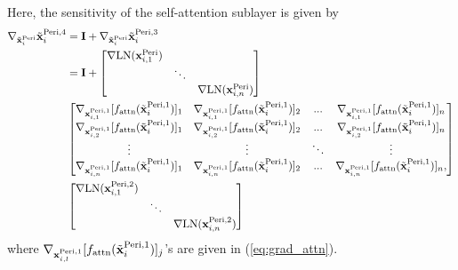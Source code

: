 \documentclass[journal]{IEEEtran}
\newcommand{\bfI}{{\bf I}}
\newcommand{\bfx}{{\bf x}}
\theoremstyle{plain}
\theoremstyle{definition}
\theoremstyle{remark}
\begin{document}
Here, the sensitivity of the self-attention sublayer is given by
\begin{align}
    \nabla_{\tilde{\bfx}_i^{{\rm Peri}}} \tilde{\bfx}_i^{{\rm Peri}, 4} &= \bfI +  \nabla_{\tilde{\bfx}_i^{{\rm Peri}}} \tilde{\bfx}_i^{{\rm Peri}, 3} \\
    &= \bfI + \begin{bmatrix}
\nabla {\rm LN}(\bfx^{{\rm Peri}}_{i, 1}) &        &        \\
                 & \ddots &        \\
                 &        & \nabla {\rm LN}(\bfx^{{\rm Peri}}_{i, n})
\end{bmatrix} \\ &
\begin{bmatrix}
\nabla_{\bfx^{{\rm Peri},1}_{i, 1}} [f_{\rm attn}(\tilde{\bfx}^{{\rm Peri},1}_{i})]_1 &  \nabla_{\bfx^{{\rm Peri},1}_{i, 1}} [f_{\rm attn}(\tilde{\bfx}^{{\rm Peri},1}_{i})]_2  & ...    &    \nabla_{\bfx^{{\rm Peri},1}_{i, 1}} [f_{\rm attn}(\tilde{\bfx}^{{\rm Peri},1}_{i})]_n    \\
\nabla_{\bfx^{{\rm Peri},1}_{i, 2}} [f_{\rm attn}(\tilde{\bfx}^{{\rm Peri},1}_{i})]_1 &  \nabla_{\bfx^{{\rm Peri},1}_{i, 2}} [f_{\rm attn}(\tilde{\bfx}^{{\rm Peri},1}_{i})]_2  & ...    &    \nabla_{\bfx^{{\rm Peri},1}_{i, 2}} [f_{\rm attn}(\tilde{\bfx}^{{\rm Peri},1}_{i})]_n    \\
     \vdots        &  \vdots  & \ddots &    \vdots    \\
\nabla_{\bfx^{{\rm Peri},1}_{i, n}} [f_{\rm attn}(\tilde{\bfx}^{{\rm Peri},1}_{i})]_1 &  \nabla_{\bfx^{{\rm Peri},1}_{i, n}} [f_{\rm attn}(\tilde{\bfx}^{{\rm Peri},1}_{i})]_2  & ...    &    \nabla_{\bfx^{{\rm Peri},1}_{i, n}} [f_{\rm attn}(\tilde{\bfx}^{{\rm Peri},1}_{i})]_n,   
\end{bmatrix}\\ 
& \begin{bmatrix}
\nabla {\rm LN}(\bfx^{{\rm Peri}, 2}_{i, 1}) &        &        \\
                 & \ddots &        \\
                 &        & \nabla {\rm LN}(\bfx^{{\rm Peri}, 2}_{i, n})
\end{bmatrix}
\end{align}
where $\nabla_{\bfx^{{\rm Peri},1}_{i, l}} [f_{\rm attn}(\tilde{\bfx}^{{\rm Peri},1}_{i})]_j$'s are given in (\ref{eq:grad_attn}).
\end{document}
